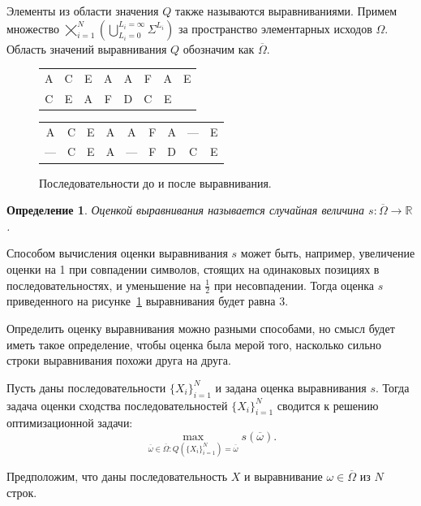 \documentclass[specialist,
substylefile = spbu_report.rtx,
subf,href,colorlinks=true, 12pt]{disser}
\newtheorem{defenition}{Определение}
\begin{document}
		Элементы из области значения $Q$ также называются выравниваниями. Примем множество $\bigtimes_{i=1}^{N}(\bigcup_{L_i=0}^{L_i=\infty} \Sigma^{L_i})$ за пространство элементарных исходов $\Omega$. Область значений выравнивания $Q$ обозначим как $\overline \Omega$.
		
		\begin{figure}[H]
			\centering
			\begin{tabular}{cccccccc}
				A&C&E&A&A&F&A&E\\
				C&E&A&F&D&C&E&
			\end{tabular}
		\end{figure}
		\begin{figure}[H]
			\centering
			\begin{tabular}{ccccccccc}
				A&C&E&A&A&F&A&—&E\\
				—&C&E&A&—&F&D&C&E
			\end{tabular}
			\caption{Последовательности до и после выравнивания.} \label{fg:1}
		\end{figure}
		
		\begin{defenition}				
			Оценкой выравнивания называется случайная величина $s:\overline \Omega \rightarrow \mathbb{R}$.
		\end{defenition}	
		
		Способом вычисления оценки выравнивания $s$ может быть, например, увеличение оценки на 1 при совпадении символов, стоящих на одинаковых позициях в последовательностях, и уменьшение на $\frac{1}{2}$ при несовпадении. Тогда оценка $s$ приведенного на рисунке~\ref{fg:1} выравнивания будет равна 3.
						
		Определить оценку выравнивания можно разными способами, но смысл будет иметь такое определение, чтобы оценка была мерой того, насколько сильно строки выравнивания похожи друга на друга.
		
		Пусть даны последовательности $\{X_i\}_{i=1}^{N}$ и задана оценка выравнивания $s$. Тогда задача оценки сходства последовательностей $\{X_i\}_{i=1}^{N}$ сводится к решению оптимизационной задачи:		
		\begin{equation*}
			\max_{\overline{\omega} \in \overline{\Omega} : Q(\{X_i\}_{i=1}^{N}) = \overline{\omega}}s(\overline{\omega}). \label{eq:1}
		\end{equation*}	
	
		Предположим, что даны последовательность $X$ и выравнивание $\omega \in \overline{\Omega}$ из $N$ строк. 
				
\end{document}
